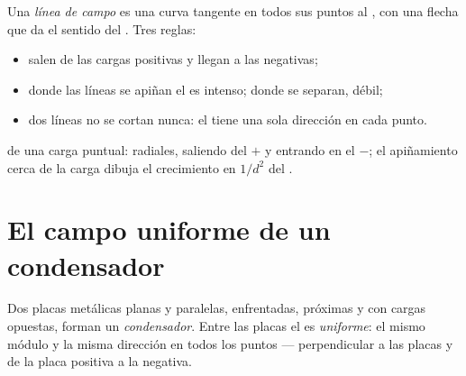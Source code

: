 \begin{definition}\label{def:g11:electric-gravitational-fields:lines}
Una \emph{línea de campo} es una curva tangente en
todos sus puntos al , con una flecha que da el sentido del .
Tres reglas:
\begin{itemize}
  \item salen de las cargas positivas y llegan a las negativas;
  \item donde las líneas se apiñan el  es intenso; donde se
        separan, débil;
  \item dos líneas no se cortan nunca: el  tiene una sola dirección
        en cada punto.
\end{itemize}
\end{definition}

\begin{omfigure}
\qquad\qquad
{}

{\small {} de una carga puntual: radiales, saliendo del $+$
y entrando en el $-$; el apiñamiento cerca de la carga dibuja el
crecimiento en $1/d^2$ del .}
\end{omfigure}

\section{El campo uniforme de un condensador}

\begin{definition}\label{def:g11:electric-gravitational-fields:capacitor}
Dos placas metálicas planas y paralelas, enfrentadas, próximas y con
cargas opuestas, forman un \emph{condensador}. Entre
las placas el  es \emph{uniforme}: el mismo
módulo y la misma dirección en todos los puntos --- perpendicular a las
placas y de la placa positiva a la negativa.
\end{definition}

